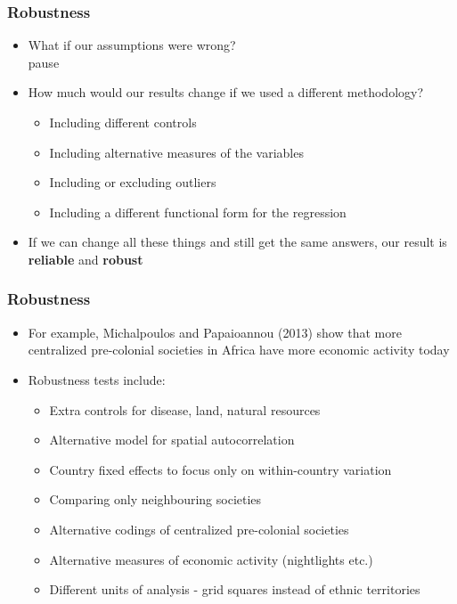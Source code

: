\documentclass[xcolor=x11names,compress]{beamer}\usepackage[]{graphicx}\usepackage[]{color}
\renewcommand{\(}{\begin{columns}}
\renewcommand{\)}{\end{columns}}
\newcommand{\<}[1]{\begin{column}{#1}}
\renewcommand{\>}{\end{column}}
\begin{document}
\begin{frame}
\frametitle{Robustness}
\begin{itemize}
\item What if our assumptions were wrong?
\\pause
\item How much would our results change if we used a different methodology?
\pause
\begin{itemize}
\item Including different controls
\pause
\item Including alternative measures of the variables
\pause
\item Including or excluding outliers
\pause
\item Including a different functional form for the regression
\pause
\end{itemize}
\item If we can change all these things and still get the same answers, our result is \textbf{reliable} and \textbf{robust}
\end{itemize}
\end{frame}

\begin{frame}
\frametitle{Robustness}
\begin{itemize}
\item For example, Michalpoulos and Papaioannou (2013) show that more centralized pre-colonial societies in Africa have more economic activity today
\pause
\item Robustness tests include:
\begin{itemize}
\item Extra controls for disease, land, natural resources
\item Alternative model for spatial autocorrelation
\item Country fixed effects to focus only on within-country variation
\item Comparing only neighbouring societies
\item Alternative codings of centralized pre-colonial societies
\item Alternative measures of economic activity (nightlights etc.)
\item Different units of analysis - grid squares instead of ethnic territories
\end{itemize}
\end{itemize}
\end{frame}
\end{document}
